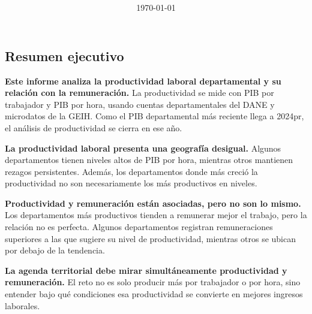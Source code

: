 \documentclass[12pt, a4paper]{article}
\title{\reporttitle\\\reportsubtitle}
\author{\reportauthorone \and \reportauthortwo}
\date{\today}
\begin{document}


\begin{mdframed}[
  linewidth=1pt,
  linecolor=gray!60,
  backgroundcolor=gray!6,
  innertopmargin=12pt,
  innerbottommargin=12pt,
  innerleftmargin=14pt,
  innerrightmargin=14pt
]
\section*{Resumen ejecutivo}

\textbf{Este informe analiza la productividad laboral departamental y su relación con la remuneración.} La productividad se mide con PIB por trabajador y PIB por hora, usando cuentas departamentales del DANE y microdatos de la GEIH. Como el PIB departamental más reciente llega a 2024pr, el análisis de productividad se cierra en ese año.

\textbf{La productividad laboral presenta una geografía desigual.} Algunos departamentos tienen niveles altos de PIB por hora, mientras otros mantienen rezagos persistentes. Además, los departamentos donde más creció la productividad no son necesariamente los más productivos en niveles.

\textbf{Productividad y remuneración están asociadas, pero no son lo mismo.} Los departamentos más productivos tienden a remunerar mejor el trabajo, pero la relación no es perfecta. Algunos departamentos registran remuneraciones superiores a las que sugiere su nivel de productividad, mientras otros se ubican por debajo de la tendencia.

\textbf{La agenda territorial debe mirar simultáneamente productividad y remuneración.} El reto no es solo producir más por trabajador o por hora, sino entender bajo qué condiciones esa productividad se convierte en mejores ingresos laborales.
\end{mdframed}

\newpage
\tableofcontents
\newpage


\end{document}
